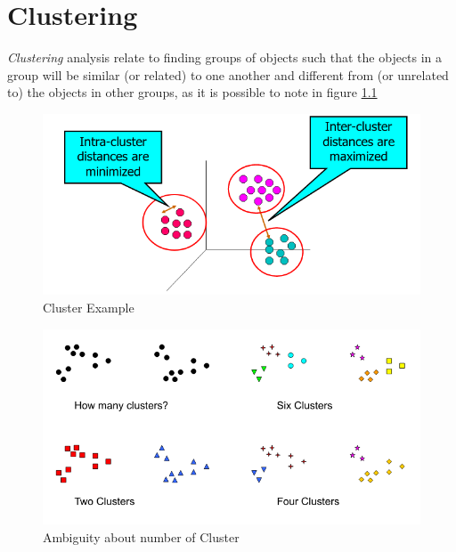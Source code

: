 \chapter{Clustering}
\emph{Clustering} analysis relate to finding groups of objects such that the objects in a group will be similar (or related) to one another 
and different from (or unrelated to) the objects in other groups, as it is possible to note in figure \ref{img:cluster}

\begin{figure}
    \caption{Cluster Example}
    \label{img:cluster}
    \includegraphics[width=\textwidth]{Images/cluster}
\end{figure}

\begin{figure}
    \caption{Ambiguity about number of Cluster}
    \label{img:ambiguousCluster}
    \includegraphics[width=\textwidth]{Images/anomoulous}
\end{figure}

